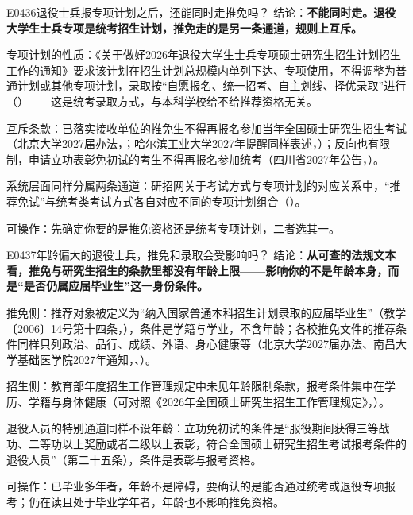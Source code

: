 \begin{qa}{E0436}{退役士兵报专项计划之后，还能同时走推免吗？}
结论：\textbf{不能同时走。退役大学生士兵专项是统考招生计划，推免走的是另一条通道，规则上互斥。}

专项计划的性质：《关于做好2026年退役大学生士兵专项硕士研究生招生计划招生工作的通知》要求该计划在招生计划总规模内单列下达、专项使用，不得调整为普通计划或其他专项计划，录取按“自愿报名、统一招考、自主划线、择优录取”进行（）——这是统考录取方式，与本科学校给不给推荐资格无关。

互斥条款：已落实接收单位的推免生不得再报名参加当年全国硕士研究生招生考试（北京大学2027届办法，；哈尔滨工业大学2027年提醒同样表述，）；反向也有限制，申请立功表彰免初试的考生不得再报名参加统考（四川省2027年公告，）。

系统层面同样分属两条通道：研招网关于考试方式与专项计划的对应关系中，“推荐免试”与统考类考试方式各自对应不同的专项计划组合（）。

可操作：先确定你要的是推免资格还是统考专项计划，二者选其一。
\end{qa}

\begin{qa}{E0437}{年龄偏大的退役士兵，推免和录取会受影响吗？}
结论：\textbf{从可查的法规文本看，推免与研究生招生的条款里都没有年龄上限——影响你的不是年龄本身，而是“是否仍属应届毕业生”这一身份条件。}

推免侧：推荐对象被定义为“纳入国家普通本科招生计划录取的应届毕业生”（教学〔2006〕14号第十四条，），条件是学籍与学业，不含年龄；各校推免文件的推荐条件同样只列政治、品行、成绩、外语、身心健康等（北京大学2027届办法、南昌大学基础医学院2027年通知，、）。

招生侧：教育部年度招生工作管理规定中未见年龄限制条款，报考条件集中在学历、学籍与身体健康（可对照《2026年全国硕士研究生招生工作管理规定》，）。

退役人员的特别通道同样不设年龄：立功免初试的条件是“服役期间获得三等战功、二等功以上奖励或者二级以上表彰，符合全国硕士研究生招生考试报考条件的退役人员”（第二十五条），条件是表彰与报考资格。

可操作：已毕业多年者，年龄不是障碍，要确认的是能否通过统考或退役专项报考；仍在读且处于毕业学年者，年龄也不影响推免资格。
\end{qa}

